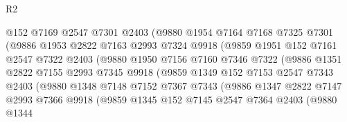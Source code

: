 \begin{lexlean}{R2}
\begin{coremodule}
                        @152
                        @7169
                        @2547
                        @7301
                        @2403
                        (@9880
                          @1954
                          @7164
                          @7168
                          @7325
                          @7301
                          (@9886
                            @1953
                            @2822
                            @7163
                            @2993
                            @7324
                            @9918
                            (@9859
                              @1951
                              @152
                              @7161
                              @2547
                              @7322
                              @2403
                              (@9880
                                @1950
                                @7156
                                @7160
                                @7346
                                @7322
                                (@9886
                                  @1351
                                  @2822
                                  @7155
                                  @2993
                                  @7345
                                  @9918
                                  (@9859
                                    @1349
                                    @152
                                    @7153
                                    @2547
                                    @7343
                                    @2403
                                    (@9880
                                      @1348
                                      @7148
                                      @7152
                                      @7367
                                      @7343
                                      (@9886
                                        @1347
                                        @2822
                                        @7147
                                        @2993
                                        @7366
                                        @9918
                                        (@9859
                                          @1345
                                          @152
                                          @7145
                                          @2547
                                          @7364
                                          @2403
                                          (@9880
                                            @1344

\end{coremodule}
\end{lexlean}
